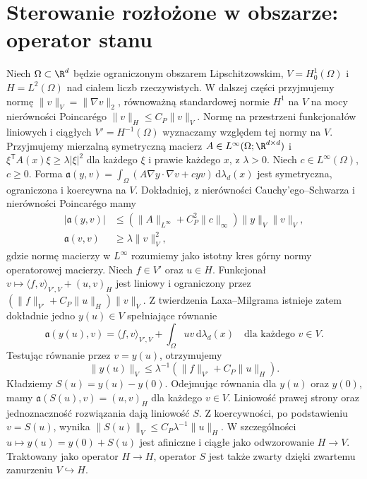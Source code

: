 \section{Sterowanie rozłożone w obszarze: operator stanu}
Niech $\Omega\subset\R^d$ będzie ograniczonym obszarem
Lipschitzowskim, $V=H_0^1(\Omega)$ i $H=L^2(\Omega)$
nad ciałem liczb rzeczywistych. W dalszej części
przyjmujemy normę $\|v\|_V=\|\nabla v\|_2$,
równoważną standardowej normie $H^1$ na $V$
na mocy nierówności Poincarégo
$\|v\|_H\le C_P\|v\|_V$.
Normę na przestrzeni funkcjonałów liniowych i ciągłych
$V'=H^{-1}(\Omega)$
wyznaczamy względem tej normy na $V$.
Przyjmujemy mierzalną symetryczną macierz
$A\in L^\infty(\Omega;\R^{d\times d})$
i $\xi^{\mathsf T}A(x)\xi\ge\lambda|\xi|^2$ dla
każdego $\xi$ i prawie każdego $x$, z $\lambda>0$.
Niech $c\in L^\infty(\Omega)$, $c\ge0$.
Forma
$\mathfrak a(y,v)=\int_\Omega
(A\nabla y\cdot\nabla v+cyv)\,\mathrm d\lambda_d(x)$
jest symetryczna, ograniczona i koercywna na $V$.
Dokładniej, z nierówności Cauchy'ego--Schwarza
i nierówności Poincarégo mamy
\[
 \begin{aligned}
 |\mathfrak a(y,v)|
 &\le(\|A\|_{L^\infty}+C_P^2\|c\|_\infty)
 \|y\|_V\|v\|_V,\\
 \mathfrak a(v,v)&\ge\lambda\|v\|_V^2,
 \end{aligned}
\]
gdzie normę macierzy w $L^\infty$ rozumiemy
jako istotny kres górny normy operatorowej macierzy.
Niech $f\in V'$ oraz $u\in H$. Funkcjonał
$v\mapsto\langle f,v\rangle_{V',V}+(u,v)_H$
jest liniowy i ograniczony przez
$(\|f\|_{V'}+C_P\|u\|_H)\|v\|_V$.
Z twierdzenia Laxa--Milgrama istnieje zatem
dokładnie jedno $y(u)\in V$ spełniające równanie
\begin{equation}\label{eq:pde32-state}
 \mathfrak a(y(u),v)=\langle f,v\rangle_{V',V}
 +\int_\Omega uv\,\mathrm d\lambda_d(x)
 \quad\text{dla każdego }v\in V.
\end{equation}
Testując równanie przez $v=y(u)$, otrzymujemy
\[
 \|y(u)\|_V\le\lambda^{-1}
 (\|f\|_{V'}+C_P\|u\|_H).
\]
Kładziemy $S(u)=y(u)-y(0)$. Odejmując równania
dla $y(u)$ oraz $y(0)$, mamy
$\mathfrak a(S(u),v)=(u,v)_H$ dla każdego $v\in V$.
Liniowość prawej strony oraz jednoznaczność
rozwiązania dają liniowość $S$.
Z koercywności, po podstawieniu $v=S(u)$,
wynika $\|S(u)\|_V\le C_P\lambda^{-1}\|u\|_H$.
W szczególności $u\mapsto y(u)=y(0)+S(u)$
jest afiniczne i ciągłe jako odwzorowanie $H\to V$.
Traktowany jako operator $H\to H$, operator $S$
jest także zwarty dzięki zwartemu zanurzeniu $V\hookrightarrow H$.

